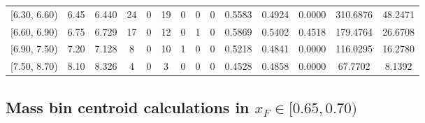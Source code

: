 \begin{table}[htbp]
{\begin{tabular}{cc|c|cccccc|ccc|cc}
        {[6.30, 6.60)} & 6.45 & 6.440 & 24 & 0 & 19 & 0 & 0 & 0 & 0.5583 & 0.4924 & 0.0000 & 310.6876 & 48.2471 \\
        {[6.60, 6.90)} & 6.75 & 6.729 & 17 & 0 & 12 & 0 & 1 & 0 & 0.5869 & 0.5402 & 0.4518 & 179.4764 & 26.6708 \\
        {[6.90, 7.50)} & 7.20 & 7.128 & 8 & 0 & 10 & 1 & 0 & 0 & 0.5218 & 0.4841 & 0.0000 & 116.0295 & 16.2780 \\
        {[7.50, 8.70)} & 8.10 & 8.326 & 4 & 0 & 3 & 0 & 0 & 0 & 0.4528 & 0.4858 & 0.0000 & 67.7702 & 8.1392 \\
        \hline\hline
    \end{tabular}
    }
\end{table}

\clearpage
\subsection{\texorpdfstring{Mass bin centroid calculations in $x_F \in [0.65, 0.70)$}{Mass bin centroid calculations in x\_F in [0.65, 0.70)]}}

